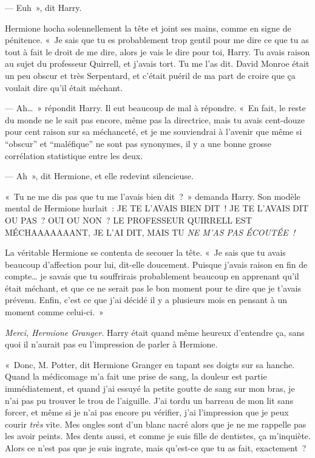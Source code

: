 --- Euh~», dit Harry.

Hermione hocha solennellement la tête et joint ses mains, comme en signe de pénitence. «~Je sais que tu es probablement trop gentil pour me dire ce que tu as tout à fait le droit de me dire, alors je vais le dire pour toi, Harry. Tu avais raison au sujet du professeur Quirrell, et j'avais tort. Tu me l'as dit. David Monroe était un peu obscur et très Serpentard, et c'était puéril de ma part de croire que ça voulait dire qu'il était méchant.

--- Ah…~» répondit Harry. Il eut beaucoup de mal à répondre. «~En fait, le reste du monde ne le sait pas encore, même pas la directrice, mais tu avais cent-douze pour cent raison sur sa méchanceté, et je me souviendrai à l'avenir que même si “obscur” et “maléfique” ne sont pas synonymes, il y a une bonne grosse corrélation statistique entre les deux.

--- Ah~», dit Hermione, et elle redevint silencieuse.

«~Tu ne me dis pas que tu me l'avais bien dit~?~» demanda Harry. Son modèle mental de Hermione hurlait~: JE TE L'AVAIS BIEN DIT~! JE TE L'AVAIS DIT OU PAS~? OUI OU NON~? LE PROFESSEUR QUIRRELL EST MÉCHAAAAAAANT, JE L'AI DIT, MAIS TU \emph{NE M'AS PAS ÉCOUTÉE~!}

La véritable Hermione se contenta de secouer la tête. «~Je sais que tu avais beaucoup d'affection pour lui, dit-elle doucement. Puisque j'avais raison en fin de compte… je savais que tu souffrirais probablement beaucoup en apprenant qu'il était méchant, et que ce ne serait pas le bon moment pour te dire que je t'avais prévenu. Enfin, c'est ce que j'ai décidé il y a plusieurs mois en pensant à un moment comme celui-ci.~»

\emph{Merci, Hermione Granger.} Harry était quand même heureux d'entendre ça, sans quoi il n'aurait pas eu l'impression de parler à Hermione.

«~Donc, M. Potter, dit Hermione Granger en tapant ses doigts sur sa hanche. Quand la médicomage m'a fait une prise de sang, la douleur est partie immédiatement, et quand j'ai essuyé la petite goutte de sang sur mon bras, je n'ai pas pu trouver le trou de l'aiguille. J'ai tordu un barreau de mon lit sans forcer, et même si je n'ai pas encore pu vérifier, j'ai l'impression que je peux courir \emph{très} vite. Mes ongles sont d'un blanc nacré alors que je ne me rappelle pas les avoir peints. Mes dents aussi, et comme je suis fille de dentistes, ça m'inquiète. Alors ce n'est pas que je suis ingrate, mais qu'est-ce que tu as fait, exactement~?

